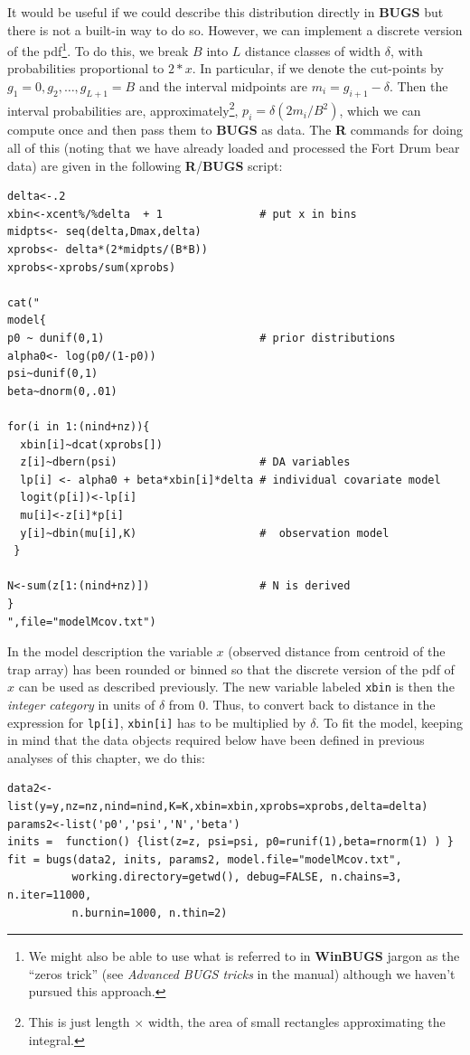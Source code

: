 It would be useful if we could describe this distribution directly in {\bf
  BUGS} but there is not a built-in way to do so. However, we can
implement a discrete version of the pdf\footnote{We might
also be able to use what is referred to in {\bf WinBUGS} jargon as the
``zeros trick'' (see {\it Advanced BUGS tricks} in the manual)
although we haven't pursued this approach.}. To do this,
we break $B$ into $L$
distance classes of width $\delta$, with probabilities proportional to
$2*x$. In particular, if we denote the cut-points by $g_{1}=0,g_{2},
\ldots, g_{L+1}=B$ and the interval midpoints are $m_{i} =
g_{i+1}-\delta$.
Then the interval probabilities are, approximately\footnote{This is
  just length $\times$ width, the area of small rectangles approximating the integral.}, $p_{i} =
\delta (2 m_{i} /B^{2})$, which we can compute once and then
pass them to {\bf BUGS} as data.
The {\bf R} commands for doing all of this (noting that we have
already loaded and processed the Fort Drum bear data) are given in the
following {\bf R}/{\bf BUGS} script:
{\small
\begin{verbatim}
delta<-.2
xbin<-xcent%/%delta  + 1               # put x in bins
midpts<- seq(delta,Dmax,delta)
xprobs<- delta*(2*midpts/(B*B))
xprobs<-xprobs/sum(xprobs)

cat("
model{
p0 ~ dunif(0,1)                        # prior distributions
alpha0<- log(p0/(1-p0))
psi~dunif(0,1)
beta~dnorm(0,.01)

for(i in 1:(nind+nz)){
  xbin[i]~dcat(xprobs[])
  z[i]~dbern(psi)                      # DA variables
  lp[i] <- alpha0 + beta*xbin[i]*delta # individual covariate model
  logit(p[i])<-lp[i]
  mu[i]<-z[i]*p[i]
  y[i]~dbin(mu[i],K)                   #  observation model
 }

N<-sum(z[1:(nind+nz)])                 # N is derived
}
",file="modelMcov.txt")
\end{verbatim}
}
In the model description the variable $x$ (observed distance
from centroid of the trap array) has been rounded or binned so that the discrete
version of the pdf of $x$ can be used as described previously. The new
variable labeled \mbox{\tt xbin} is then the {\it integer category}
in units of $\delta$ from 0. Thus, to convert back to distance in the
expression for \mbox{\tt lp[i]}, \mbox{\tt xbin[i]} has to be multiplied by
$\delta$.
To fit the model, keeping in mind that the data objects
required below have been defined in previous analyses of this chapter,
we do this:
{\small
\begin{verbatim}
data2<-list(y=y,nz=nz,nind=nind,K=K,xbin=xbin,xprobs=xprobs,delta=delta)
params2<-list('p0','psi','N','beta')
inits =  function() {list(z=z, psi=psi, p0=runif(1),beta=rnorm(1) ) }
fit = bugs(data2, inits, params2, model.file="modelMcov.txt",
          working.directory=getwd(), debug=FALSE, n.chains=3, n.iter=11000,
          n.burnin=1000, n.thin=2)
\end{verbatim}
}

